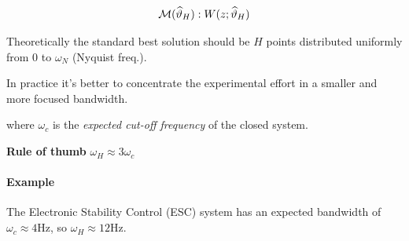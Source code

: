 \[
    \mathcal{M}(\widehat{\vartheta}_H): W(z; \widehat{\vartheta}_H)
\]


\begin{remark}[Frequency bandwidth selection $\omega_H =\; ?$]
    Theoretically the standard best solution should be $H$ points distributed uniformly from 0 to $\omega_N$ (Nyquist freq.).

    In practice it's better to concentrate the experimental effort in a smaller and more focused bandwidth.

    \begin{figure}[H]
        \centering
    \end{figure}

    where $\omega_c$ is the \emph{expected cut-off frequency} of the closed system.
    
    \textbf{Rule of thumb} $\omega_H \approx 3\omega_c$

    \paragraph{Example} The Electronic Stability Control (ESC) system has an expected bandwidth of $\omega_c \approx 4 \text{Hz}$, so $\omega_H \approx 12\text{Hz}$.
\end{remark}

